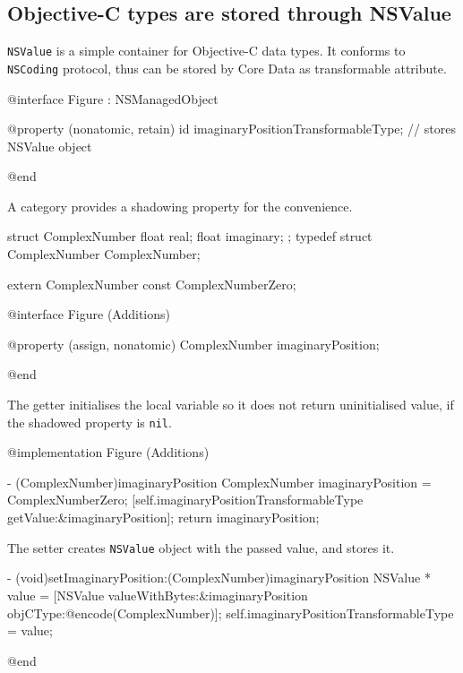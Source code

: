 \documentclass[10pt]{extarticle}
\newenvironment{codelisting}
{\footnotesize\mdframed[middlelinewidth=0.5pt, middlelinecolor=BaliHaiColor, skipabove=15pt]\verbatim}
{\endverbatim\endmdframed\vspace{12pt}\normalsize}
\newcommand{\inlinecode}[1]{{\textcolor{TundoraColor}{\texttt{#1}}}}
\begin{document}
\subsection{Objective-C types are stored through NSValue}

\inlinecode{NSValue} is a simple container for Objective-C data types. It conforms to \inlinecode{NSCoding} protocol, thus can be stored by Core Data as transformable attribute. 

\begin{codelisting}
@interface Figure : NSManagedObject

@property (nonatomic, retain) id imaginaryPositionTransformableType;	          // stores NSValue object

@end
\end{codelisting}

A category provides a shadowing property for the convenience.

\begin{codelisting}
struct ComplexNumber {
    float real;
    float imaginary;
};
typedef struct ComplexNumber ComplexNumber;

extern ComplexNumber const ComplexNumberZero;


@interface Figure (Additions)

@property (assign, nonatomic) ComplexNumber imaginaryPosition;

@end
\end{codelisting}

The getter initialises the local variable so it does not return uninitialised value, if the shadowed property is \inlinecode{nil}.

\begin{codelisting}
@implementation Figure (Additions)

- (ComplexNumber)imaginaryPosition
{
    ComplexNumber imaginaryPosition = ComplexNumberZero;
    [self.imaginaryPositionTransformableType getValue:&imaginaryPosition];
    return imaginaryPosition;
}
\end{codelisting}

The setter creates \inlinecode{NSValue} object with the passed value, and stores it.

\begin{codelisting}
- (void)setImaginaryPosition:(ComplexNumber)imaginaryPosition
{
    NSValue * value = [NSValue valueWithBytes:&imaginaryPosition objCType:@encode(ComplexNumber)];
    self.imaginaryPositionTransformableType = value;
}

@end
\end{codelisting}
\end{document}
